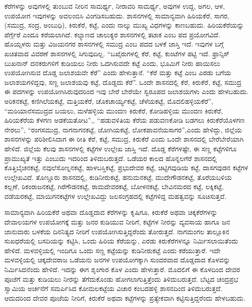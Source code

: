ಕೆರೆಗಳನ್ನು ಅವುಗಳಲ್ಲಿ ತುಂಬುವ ನೀರಿನ ಸಾಮರ್ಥ್ಯ, ನೀರಾವರಿ ಸಾಮರ್ಥ್ಯ, ಅವುಗಳ ಉದ್ದ, ಅಗಲ, ಆಳ, ಉಪಯೋಗ ಇವುಗಳನ್ನು ಅವಲಂಬಿಸಿ ವಿಂಗಡಿಸಬಹುದು. ಶಾಸನಗಳಲ್ಲಿ ಸಾಮಾನ್ಯವಾಗಿ ಹಿರಿಯಕೆರೆ, ಸಾಗರ, (ಸಮುದ್ರ, ಸಂದ್ರ, ಅಂಬುಧಿ), ಕಿರುಕೆರೆ, ಕಟ್ಟೆ, ಎಂದು ನಾಲ್ಕು ಮುಖ್ಯ ವಿಧಗಳನ್ನು ಕಾಣಬಹುದು. ಹಿರಿಯಕೆರೆಯನ್ನು ಪೆರ್ಗ್ಗೆರೆ ಎಂದೂ ಕರೆಯಲಾಗಿದೆ. ಕಲ್ಯಾಣದ ಚಾಲುಕ್ಯರ ಶಾಸನಗಳಲ್ಲಿ ತಟಾಕ ಎಂಬ ಪದ ಪ್ರಯೋಗವಿದೆ. ಹೊಯ್ಸಳರು ಮತ್ತು ವಿಜಯನಗರ ಶಾಸನಗಳಲ್ಲಿ ಸಮುದ್ರ ಎಂಬ ಪದದ ಬಳಕೆ ಜಾಸ್ತಿ ಇದೆ. ಇವುಗಳ ಬಗ್ಗೆ ಖಚಿತವಾದ ವಿವರಣೆ ಶಾಸನಗಳಲ್ಲಿ ಸಿಗುವುದಿಲ್ಲ. “ಬಖೈರುಗಳಲ್ಲಿ ಕೆರೆ, ಕಟ್ಟೆ, ಕುಂಟೆಗಳ ಪಟ್ಟಿ ಇದೆ. ಫ್ರಾನ್ಸಿಸ್​ ಬುಖನಾನ್​ ದನಕರುಗಳಿಗೆ ಕುಡಿಯಲು ನೀರು ಒದಗಿಸುವದೇ ಕಟ್ಟೆ ಎಂದು, ಭೂಮಿಗೆ ನೀರು ಹಾಯಿಸಲು ಉಪಯೋಗಿಸುವ ದೊಡ್ಡ ಜಲಾಶಯವೇ ಕೆರೆ” ಎಂದು ಹೇಳುತ್ತಾನೆ. “ಕೆರೆ ಮತ್ತು ಕಟ್ಟೆ ಎಂಬ ಎರಡು ಬಗೆಯ ಜಲಾಶಯಗಳಿದ್ದವು, ಸಣ್ಣ ಜಲಾಶಯವು ಕಟ್ಟೆ, ದೊಡ್ಡದು ಕೆರೆ”. ಒಂದೇ ಶಾಸನದಲ್ಲಿ ಕೆರೆ, ಕಿರುಕೆರೆ, ಕಟ್ಟೆ, ಸಮುದ್ರ ಈ ಪದಗಳನ್ನು ಉಪಯೋಗಿಸಿರುವುದರಿಂದ ಇವು ಬೇರೆ ಬೇರೆಯೇ ಸ್ವರೂಪದ ಜಲಾಶಯಗಳು ಎಂದು ಹೇಳಬಹುದು. ಅರಿಕನಕಟ್ಟೆ, ಕಣಿಗಿಲೆಯಕಟ್ಟೆ, ಮತ್ತಿಯಕೆರೆ, ಚೊಕಚಾರ್ಯ್ಯಕಟ್ಟೆ, ಚೆಳೆಯಕಟ್ಟೆ, ಮೊದಲಿಹಳ್ಳಿಯಕೆರೆ”, “ಮರಿಯಾನೆಸಮುದ್ರದ ಬಯಲು, ಮಳೆಹಳ್ಳಿಯ ಮುಂದಣ ಕಿರುಕೆರೆ, ಕೋಡಿಹಳ್ಳಿಯ ಮುಂದಣ ಕಿರುಕೆರೆ, ಹಿರಿಯಕೆರೆಯ ಕೆಳಗಣ ಅಡಕೆಯತೋಟ”,, “ಹಡುವಳಿತಿಯ ಕೆರೆಯ ಪಡುವಣಕೋಡಿ ಬಡಗಲು ಕಿರುಕೆರೆಯೊಳಗಣ ನೇರಲು”, “ರಂಗಸಮುದ್ರ, ನಾಗನಾಗನಕಟ್ಟೆ, ಜೋಗಿಯಕಟ್ಟೆ, ಲೋಕಪಾವನೆಯಸಾಗರ”,ಎಂದು ಹೇಳಿದ್ದು, ಜಿಲ್ಲೆಯ ಶಾಸನಗಳನ್ನು ಪರಿಶೀಲಿಸಿದಾಗ ಈ ರೀತಿ ಕೆರೆ, ಕಟ್ಟೆ, ಸಮುದ್ರ, ಕಿರುಕೆರೆ ಎಂದು ಒಂದೇ ಶಾಸನದಲ್ಲಿ ಬೇರೆಬೇರೆಯಾಗಿ ಹೇಳಿದೆ. ಜಿಲ್ಲೆಯ ಕೆಲವು ಶಾಸನಗಳಲ್ಲಿ ಕಟ್ಟೆಗಳ ಉಲ್ಲೇಖ ಜಾಸ್ತಿ ಇದೆ. ದೊಡ್ಡ ಕೆರೆಗಳಷ್ಟೇ, ಈ ಸಣ್ಣ ಕಟ್ಟೆಗಳಿಗೂ ಪ್ರಾಮುಖ್ಯತೆ ಇತ್ತು ಎಂಬುದು ಇದರಿಂದ ತಿಳಿದುಬರುತ್ತದೆ. ಒಡೆಯರ ಕಾಲದ ಹೊನ್ನಲಗೆರೆ ಶಾಸನದಲ್ಲಿ ಕೊತ್ತಿಬೈಚನಕಟ್ಟೆ, ನವುಲೆಸೊಣ್ನನಕಟ್ಟೆ, ಹಾಳಬಸ್ತಿಕಟ್ಟೆ, ಪ್ರಭುದೇವರ ಕಟ್ಟೆ, ಚಿಟ್ಟಿಗವುಡಿಯ ಕಟ್ಟೆ, ದಾಸಗವುಡನ ಕಟ್ಟೆಗಳ ಉಲ್ಲೇಖವಿದೆ. ತೊಣ್ಣೂರು ಶಾಸನದಲ್ಲಿ, ಕುಡಿನೀರುಕಟ್ಟೆ, ಹನುಮನಕಟ್ಟೆ, ಮುದೇಗೌಡನಕಟ್ಟೆ, ತೊರೆಯಬಳಿಯ ಕಲ್ಲಣೆ, ರಿಕಂರಾಜನಕಟ್ಟೆ, ಗಿರೆಗೌಡನಕಟ್ಟೆ, ರಾಮದೇವರಕಟ್ಟೆ, ಬೋಳನಕಟ್ಟೆ, ಬೇವಿನಮರದ ಕಟ್ಟೆ, ಲಕ್ಕಿಕಟ್ಟೆ, ವಡೆಯರಕಟ್ಟೆ, ಮಾಯಿಗನಕಟ್ಟೆಗಳ ಉಲ್ಲೇಖವಿದ್ದು ಜಲಸಂಗ್ರಹದಲ್ಲಿ ಕಟ್ಟೆಗಳಿದ್ದ ಮಹತ್ವವನ್ನು ಸೂಚಿಸುತ್ತವೆ.

ಸಾಮಾನ್ಯವಾಗಿ ಹಿರಿಯಕೆರೆ ಅಥವಾ ದೊಡ್ಡದಾದ ಕೆರೆಗಳನ್ನು ಕೃಷಿಗೂ, ಕಿರುಕೆರೆ ಅಥವಾ ಚಿಕ್ಕಕೆರೆಗಳನ್ನು ದೇವಾಲಯಗಳ ಉಪಯೋಗಕ್ಕೆ ಮತ್ತು ಜನರ ಕುಡಿಯುವ ನೀರಿಗೆ, ಕಟ್ಟೆಗಳ ನೀರನ್ನು ವ್ಯವಸಾಯ ಹಾಗೂ ಜನ ಜಾನುವಾರು ಬಳಕೆಯ ದಿನನಿತ್ಯದ ನೀರಿಗೆ ಉಪಯೋಗಿಸುತ್ತಿದ್ದರೆಂದು ತೋರುತ್ತದೆ. ನಾಗಮಂಗಲ ತಾಲ್ಲೂಕಿನ ಸುಖಧರೆಯಲ್ಲಿ ಬಸದಿಯನ್ನು ಕಟ್ಟಿಸಿ, ಒಂದು ಹಿರಿಯ ಕೆರೆಯನ್ನು, ಎರಡು ಕಿರುಕೆರೆಗಳನ್ನೂ ನಿರ್ಮಿಸಲಾಯಿತೆಂದು ಹೇಳಿದೆ. ಮಳವಳ್ಳಿಯಲ್ಲಿ ಇಂದಿಗೂ ಒಂದು ಸಣ್ಣ ಕಟ್ಟೆಯನ್ನು ಕುಡಿನೀರುಕಟ್ಟೆ ಎಂದು ಕರೆಯುತ್ತಾರೆ. ಇದೇ ಮಳವಳ್ಳಿಯಲ್ಲಿ ಚಿಕ್ಕದೇವರಾಜ ಒಡೆಯನು ಜನಗಳ ಉಪಯೋಗಕ್ಕಾಗಿ ಸುಂದರವಾದ ದೊಡ್ಡದಾದ ಕೊಳವನ್ನು ನಿರ್ಮಿಸಿದನೆಂದು ಹೇಳಿದೆ. ಇದನ್ನು ಈಗ ಶೃಂಗಾರ ಕೊಳ ಎಂದು ಹೇಳುತ್ತಾರೆ. ಮೊದಲಿಗೆ ಈ ಕೊಳದಿಂದ ದೇವರ ಪೂಜೆಗೆ ಮತ್ತು ಕುಡಿಯಲು ನೀರನ್ನು ತೆಗೆದುಕೊಂಡು ಹೋಗಲಾಗುತ್ತಿತ್ತೆಂದು ತಿಳಿದುಬರುತ್ತದೆ. ಬೆಟ್ಟದ ಚಂದ್ರಪ್ರಭ ಸ್ವಾಮಿಯ ಅರ್ಚನೆಗೆ ಸಮರ್ಪಿಸಿದ ಕೋಮಲಕಟ್ಟೆಯ ವಿಚಾರ ಕಂಬದಹಳ್ಳಿ ಶಾಸನದಿಂದ ತಿಳಿದುಬರುತ್ತದೆ. ಆದುದರಿಂದ ದೇವರ ಪೂಜೆಯ ನೀರಿಗೆ, ಕಿರುಕೆರೆ ಅಥವಾ ಕಟ್ಟೆಗಳನ್ನು ಪ್ರತ್ಯೇಕವಾಗಿ ಕಟ್ಟಿಸುತ್ತಿದ್ದರೆಂದು ಹೇಳಬಹುದು.

